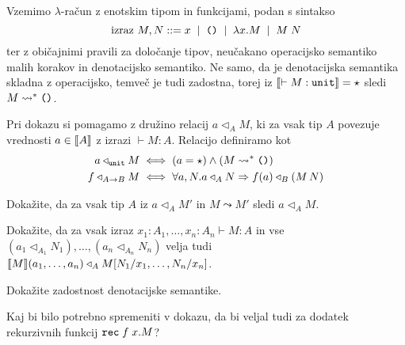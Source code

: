 \documentclass[arhiv]{../izpit}
\begin{document}
\naloga[\tocke{20}]

Vzemimo $\lambda$-račun z enotskim tipom in funkcijami, podan s sintakso
\[
  \text{izraz $M, N$} \mathrel{{:}{:}{=}}
  x \;\mid\;
  \hbox{\texttt{()}} \;\mid\;
  \lambda x. M \;\mid\;
  M \; N
\]
ter z običajnimi pravili za določanje tipov, neučakano operacijsko semantiko malih korakov in denotacijsko semantiko. Ne samo, da je denotacijska semantika skladna z operacijsko, temveč je tudi zadostna, torej iz $\llbracket \vdash M : \mathtt{unit} \rrbracket = \star$ sledi $M \leadsto^* \hbox{\texttt{()}}$.

Pri dokazu si pomagamo z družino relacij $a \triangleleft_A M$, ki za vsak tip $A$ povezuje vrednosti $a \in \llbracket A \rrbracket$ z izrazi $\vdash M : A$. Relacijo definiramo kot
\begin{align*}
  a \triangleleft_{\mathtt{unit}} M &\iff (a = \star) \land (M \leadsto^* \hbox{\texttt{()}}) \\
  f \triangleleft_{A \to B} M &\iff \forall a, N. a \triangleleft_A N \Rightarrow f(a) \triangleleft_B (M \, N)
\end{align*}

\podnaloga[\tocke{5}]
Dokažite, da za vsak tip $A$ iz $a \triangleleft_A M'$ in $M \leadsto M'$ sledi $a \triangleleft_A M$.

\podnaloga[\tocke{8}]
Dokažite, da za vsak izraz $x_1 : A_1, \dots, x_n : A_n \vdash M : A$ in vse $(a_1 \triangleleft_{A_1} N_1), \dots, (a_n \triangleleft_{A_n} N_n)$ velja tudi $\llbracket M \rrbracket(a_1, \dots, a_n) \triangleleft_A M[N_1 / x_1, \dots, N_n / x_n]$.

\podnaloga[\tocke{2}]
Dokažite zadostnost denotacijske semantike.

\podnaloga[\tocke{5}]
Kaj bi bilo potrebno spremeniti v dokazu, da bi veljal tudi za dodatek rekurzivnih funkcij $\mathtt{rec}\;f\;x. M$?

\nadaljevanje
\end{document}
